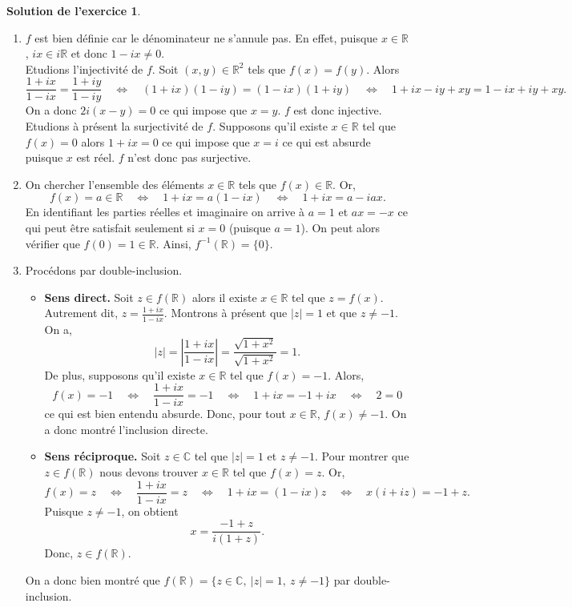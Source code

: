 \documentclass[a4paper, 11pt,openany]{article}%
\theoremstyle{plain}
\theoremstyle{definition}
\newtheorem{sol}{Solution de l'exercice}
\theoremstyle{remark}
\newcommand{\R}{\mathbb{R}}
\newcommand{\C}{\mathbb{C}}
\begin{document}
\begin{sol}
\begin{enumerate}
 \item $f$ est bien définie car le dénominateur ne s'annule pas. En effet, puisque $x \in \R$, $ix \in i \R$ et donc $1 - ix \neq 0$.\\
 Etudions l'injectivité de $f$. Soit $(x,y) \in \R^2$ tels que $f(x) = f(y)$. Alors
 \[ \frac{1+ix}{1-ix} = \frac{1+iy}{1-iy} \quad \Leftrightarrow \quad (1+ix)(1-iy) = (1-ix)(1+iy) \quad \Leftrightarrow \quad 1+ix - iy +xy = 1-ix + iy + xy.\]
 On a donc $2i(x-y) = 0$ ce qui impose que $x=y$. $f$ est donc injective.\\
 Etudions à présent la surjectivité de $f$. Supposons qu'il existe $x \in \R$ tel que $f(x) = 0$ alors $1+ix = 0$ ce qui impose que $x=i$ ce qui est absurde puisque $x$ est réel. $f$ n'est donc pas surjective.
 \item On chercher l'ensemble des éléments $x \in \R$ tels que $f(x) \in \R$. Or,
 \[ f(x) = a \in \R \quad \Leftrightarrow \quad 1+ix = a(1-ix) \quad \Leftrightarrow \quad 1+ ix = a - iax.\]
 En identifiant les parties réelles et imaginaire on arrive à $a=1$ et $ax = -x$ ce qui peut être satisfait seulement si $x = 0$ (puisque $a = 1$). On peut alors vérifier que $f(0) = 1 \in \R$. Ainsi, $f^{-1}(\R) = \{0 \}$.
 \item Procédons par double-inclusion.
 \begin{itemize}
 \item \textbf{Sens direct.} Soit $z \in f(\R)$ alors il existe $x \in\R$ tel que $z = f(x)$. Autrement dit, $z = \frac{1+ix}{1-ix}$. Montrons à présent que $|z| = 1$ et que $z \neq -1$. On a,
 \[ |z| = \left| \frac{1+ix}{1-ix} \right| = \frac{\sqrt{1+x^2}}{\sqrt{1+x^2}} = 1.\]
 De plus, supposons qu'il existe $x \in \R$ tel que $f(x) = -1$. Alors,
 \[ f(x) = -1 \quad \Leftrightarrow \quad  \frac{1+ix}{1-ix} = -1 \quad \Leftrightarrow \quad  1+ix = -1 + ix \quad \Leftrightarrow \quad  2 =0\]
 ce qui est bien entendu absurde. Donc, pour tout $x \in \R$, $f(x) \neq -1$. On a donc montré l'inclusion directe.
 \item \textbf{Sens réciproque.} Soit $z \in \C$ tel que $|z| =1$ et $z \neq -1$. Pour montrer que $z \in f(\R)$ nous devons trouver $x \in \R$ tel que $f(x) = z$. Or,
 \[ f(x) = z \quad \Leftrightarrow \quad  \frac{1+ix}{1-ix} = z \quad \Leftrightarrow \quad  1+ix = (1 - ix)z \quad \Leftrightarrow \quad  x(i +iz) = -1 + z.\]
 Puisque $z \neq -1$, on obtient
 \[ x = \frac{-1+z}{i(1+z)}.\]
 Donc, $z \in f(\R)$.
 \end{itemize}
 On a donc bien montré que $f(\mathbb R)=\{z\in\mathbb C,\ |z|=1,\ z\neq-1\}$ par double-inclusion.
\end{enumerate}
\end{sol}
\end{document}

